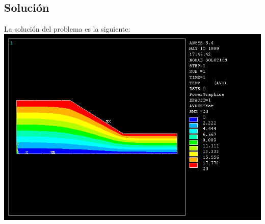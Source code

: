 \documentclass[a4paper,11pt]{article}
\begin{document}
\newpage

\subsection{Soluci\'on}

La soluci\'on del problema es la siguiente:\\

\includegraphics[scale=0.5]{solucion.png}
\end{document}
